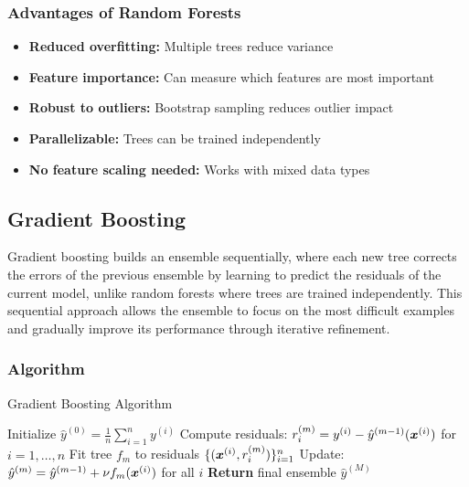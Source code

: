 \subsubsection{Advantages of Random Forests}

\begin{itemize}
    \item \textbf{Reduced overfitting:} Multiple trees reduce variance
    \item \textbf{Feature importance:} Can measure which features are most important
    \item \textbf{Robust to outliers:} Bootstrap sampling reduces outlier impact
    \item \textbf{Parallelizable:} Trees can be trained independently
    \item \textbf{No feature scaling needed:} Works with mixed data types
\end{itemize}

\subsection{Gradient Boosting}

Gradient boosting builds an ensemble sequentially, where each new tree corrects the errors of the previous ensemble by learning to predict the residuals of the current model, unlike random forests where trees are trained independently. This sequential approach allows the ensemble to focus on the most difficult examples and gradually improve its performance through iterative refinement.

\subsubsection{Algorithm}

\begin{algorithm}[htbp]
\caption{Gradient Boosting Algorithm}
\label{alg:gradient-boosting}
\begin{algorithmic}[1]
\State Initialize $\hat{y}^{(0)} = \frac{1}{n} \sum_{i=1}^{n} y^{(i)}$ 
    \State Compute residuals: $r_i^{(m)} = y^{(i)} - \hat{y}^{(m-1)}(\boldsymbol{x}^{(i)})$ for $i = 1, \ldots, n$
    \State Fit tree $f_m$ to residuals $\{(\boldsymbol{x}^{(i)}, r_i^{(m)})\}_{i=1}^{n}$
    \State Update: $\hat{y}^{(m)} = \hat{y}^{(m-1)} + \nu f_m(\boldsymbol{x}^{(i)})$ for all $i$
\EndFor
\State \textbf{Return} final ensemble $\hat{y}^{(M)}$
\end{algorithmic}
\end{algorithm}

